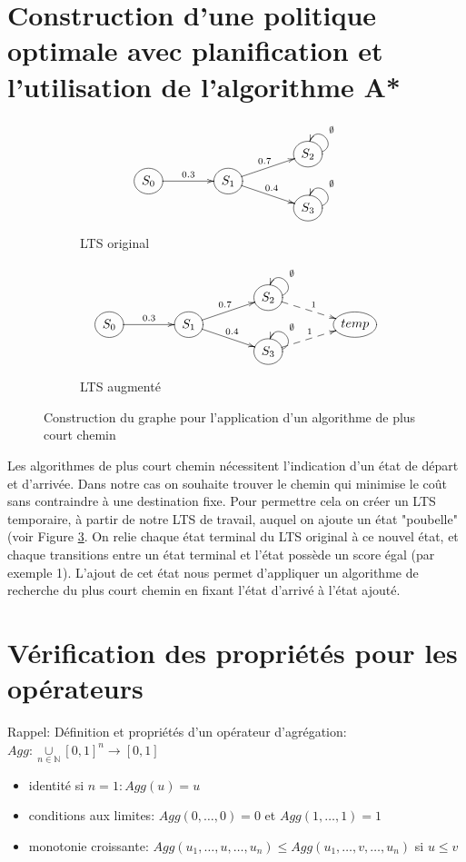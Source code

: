 \documentclass[11pt]{extarticle}
\begin{document}
\section{Construction d'une politique optimale avec planification et l'utilisation de l'algorithme A*}\label{astar}
\begin{figure}[h!]
    \centering
    \begin{subfigure}[b]{0.45\textwidth}
        \centering
        \[
            \xymatrix @R=0.1em@C=4em {
             & & *++[o][F-]{S_2}\ar@(r,u)[]_{\emptyset} 
             \\ *++[o][F-]{S_0} \ar[r]^{0.3}& *++[o][F-]{S_1} \ar[ru]^{0.7}  \ar[rd]^{0.4}   &
             \\ & &*++[o][F-]{S_3}\ar@(r,u)[]_{\emptyset} 
             }
        \]
        \caption{LTS original}
        \label{fig:diag-a}
    \end{subfigure}
    \hfill
    \begin{subfigure}[b]{0.45\textwidth}
        \centering
        \[
            \xymatrix @R=0.1em@C=4em {
             & & *++[o][F-]{S_2}\ar@(r,u)[]_{\emptyset} \ar@{-->} [rd]^{1} &
             \\ *++[o][F-]{S_0} \ar[r]^{0.3}& *++[o][F-]{S_1} \ar[ru]^{0.7}  \ar[rd]^{0.4}  &  & *++[o][F-]{temp}
             \\ & &*++[o][F-]{S_3}\ar@(r,u)[]_{\emptyset} \ar@{-->} [ru]^{1} &
             }
        \]
        \caption{LTS augmenté}
        \label{fig:diag-b}
    \end{subfigure}
    \caption{Construction du graphe pour l'application d'un algorithme de plus court chemin}
    \label{fig:lts astar}
\end{figure}
Les algorithmes de plus court chemin nécessitent l'indication d'un état de départ et d'arrivée. Dans notre cas on souhaite trouver le chemin qui minimise le coût sans contraindre à une destination fixe. Pour permettre cela on créer un LTS temporaire, à partir de notre LTS de travail, auquel on ajoute un état "poubelle" (voir Figure \ref{fig:lts astar}. On relie chaque état terminal du LTS original à ce nouvel état, et chaque transitions entre un état terminal et l'état possède un score égal (par exemple 1). L'ajout de cet état nous permet d'appliquer un algorithme de recherche du plus court chemin en fixant l'état d'arrivé à l'état ajouté.



\section{Vérification des propriétés pour les opérateurs}
Rappel:
Définition et propriétés d'un opérateur d'agrégation: $Agg: \underset{n\in \mathds{N}}{\cup}[0,1]^n\to [0,1]$
\begin{itemize}
    \item identité si $n=1 : Agg(u)=u$
    \item conditions aux limites: $Agg(0,\dots,0)=0$ et $Agg(1,\dots,1)=1$
    \item monotonie croissante: $Agg(u_1,\dots,u,\dots,u_n)\leq Agg(u_1,\dots,v,\dots,u_n)$ si $u \leq v$
\end{itemize}
\end{document}
